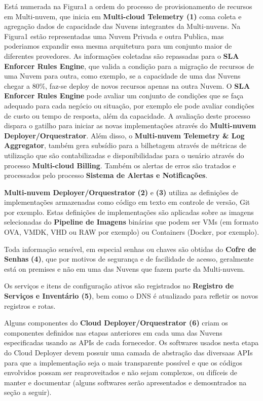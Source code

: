 \documentclass[12pt]{article}
\begin{document}
	Está numerada na Figura1 a ordem do processo de provisionamento de recursos em Multi-nuvem, que inicia em \textbf{Multi-cloud Telemetry (1)} coma coleta e agregação dados de capacidade das Nuvens integrantes da Multi-nuvens. Na Figura1 estão representadas uma Nuvem Privada e outra Publica, mas poderiamos expandir essa mesma arquitetura para um conjunto maior de diferentes provedores. As informações coletadas são repassadas para o \textbf{SLA Enforcer Rules Engine}, que valida a condição para a migração de recursos de uma Nuvem para outra, como exemplo, se a capacidade de uma das Nuvens chegar a 80\%, faz-se deploy de novos recursos apenas na outra Nuvem. O \textbf{SLA Enforcer Rules Engine} pode avaliar um conjunto de condições que se faça adequado para cada negócio ou situação, por exemplo ele pode avaliar condições de custo ou tempo de resposta, além da capacidade. A avaliação deste processo dispara o gatilho para iniciar as novas implementações através do \textbf{Multi-nuvem Deployer/Orquestrator}. Além disso, o \textbf{Multi-nuvem Telemetry \& Log Aggregator}, também gera subsídio para a bilhetagem através de métricas de utilização que são contabilizadas e disponibilidadas para o usuário através do processo \textbf{Multi-cloud Billing}. Também os alertas de erros são tratados e processados pelo processo \textbf{Sistema de Alertas e Notificações}.
	
	\textbf{Multi-nuvem Deployer/Orquestrator} \textbf{(2)} e \textbf{(3)} utiliza as definições de implementações armazenadas como código em texto em controle de versão, Git por exemplo. Estas definições de implementações são aplicadas sobre as imagens selecionadas do \textbf{Pipeline de Imagens} binárias que podem ser VMs (em formato OVA, VMDK, VHD ou RAW por exemplo) ou Containers (Docker, por exemplo).
	
	Toda informação sensível, em especial senhas ou chaves são obtidas do \textbf{Cofre de Senhas} \textbf{(4)}, que por motivos de segurança e de facilidade de acesso, geralmente está on premises e não em uma das Nuvens que fazem parte da Multi-nuvem.   
	
	Os serviços e itens de configuração ativos são registrados no \textbf{Registro de Serviços e Inventário (5)}, bem como o DNS é atualizado para refletir os novos registros e rotas.
	
	Alguns componentes do \textbf{Cloud Deployer/Orquestrator (6)} criam os componentes definidos nas etapas anteriores em cada uma das Nuvens especificadas usando as APIs de cada fornecedor. Os softwares usados nesta etapa do Cloud Deployer devem possuir uma camada de abstração das diversaas APIs para que a implementação seja o mais transparente possível e que os códigos envolvidos possam ser reaproveitados e não sejam complexos, ou difíceis de manter e documentar (alguns softwares serão apresentados e demosntrados na seção a seguir).  
\end{document}
